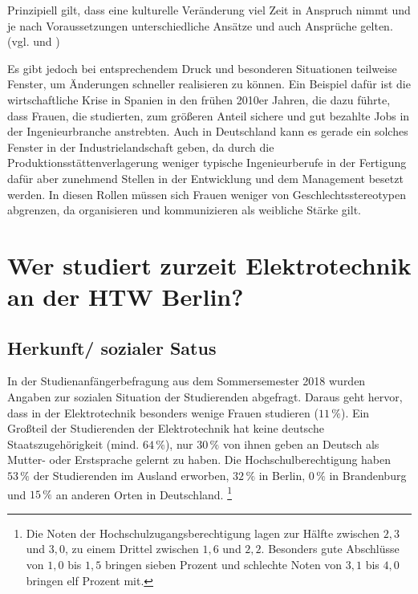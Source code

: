 \documentclass[a4paper, 12 pt]{IEEEtran}
\begin{document}
Prinzipiell gilt, dass eine kulturelle Veränderung viel Zeit in Anspruch nimmt und je nach Voraussetzungen unterschiedliche Ansätze und auch Ansprüche gelten. (vgl. \cite{Feder.2021} und \cite{}) 

Es gibt jedoch bei entsprechendem Druck und besonderen Situationen teilweise Fenster, um Änderungen schneller realisieren zu können. Ein Beispiel dafür ist die wirtschaftliche Krise in Spanien in den frühen 2010er Jahren, die dazu führte, dass Frauen, die studierten, zum größeren Anteil sichere und gut bezahlte Jobs in der Ingenieurbranche anstrebten. Auch in Deutschland kann es gerade ein solches Fenster in der Industrielandschaft geben, da durch die Produktionsstättenverlagerung weniger typische Ingenieurberufe in der Fertigung dafür aber zunehmend Stellen in der Entwicklung und dem Management besetzt werden. In diesen Rollen müssen sich Frauen weniger von Geschlechtsstereotypen abgrenzen, da organisieren und kommunizieren als weibliche Stärke gilt. 



\section{Wer studiert zurzeit Elektrotechnik an der HTW Berlin?}
\label{sec:StandBAETHTW}

\subsection{Herkunft/ sozialer Satus}
In der Studienanfängerbefragung aus dem Sommersemester 2018 wurden Angaben zur sozialen Situation der Studierenden abgefragt. Daraus geht hervor, dass in der Elektrotechnik besonders wenige Frauen studieren ($11\,\%$). Ein Großteil der Studierenden der Elektrotechnik hat keine deutsche Staatszugehörigkeit (mind. $64\,\%$), nur $30\,\%$ von ihnen geben an Deutsch als Mutter- oder Erstsprache gelernt zu haben. Die Hochschulberechtigung haben $53\,\%$ der Studierenden im Ausland erworben, $32\,\%$ in Berlin, $0\,\%$ in Brandenburg und $15\,\%$ an anderen Orten in Deutschland. \footnote{Die Noten der Hochschulzugangsberechtigung lagen zur Hälfte zwischen $2,3$ und $3,0$, zu einem Drittel zwischen $1,6$ und $2,2$. Besonders gute Abschlüsse von $1,0$ bis $1,5$ bringen sieben Prozent und schlechte Noten von $3,1$ bis $4,0$ bringen elf Prozent mit.}
\end{document}
